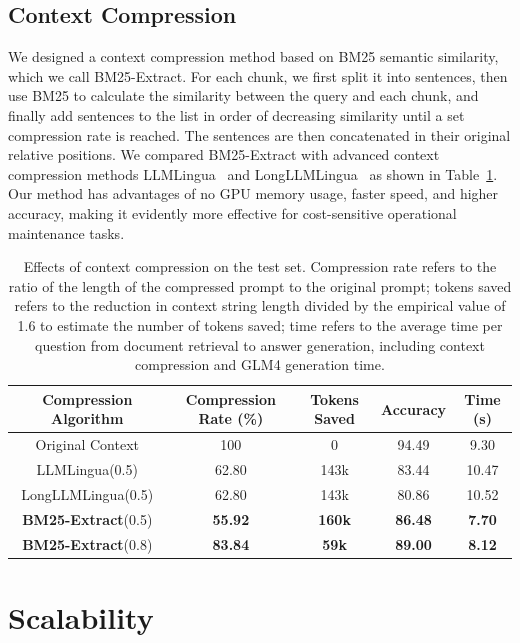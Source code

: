 \documentclass[11pt]{article}
\begin{document}
\subsection{Context Compression}

We designed a context compression method based on BM25 semantic similarity, which we call BM25-Extract. For each chunk, we first split it into sentences, then use BM25 to calculate the similarity between the query and each chunk, and finally add sentences to the list in order of decreasing similarity until a set compression rate is reached. The sentences are then concatenated in their original relative positions. We compared BM25-Extract with advanced context compression methods LLMLingua~\cite{jiang-etal-2023-llmlingua} and LongLLMLingua~\cite{jiang2023longllmlingua} as shown in Table~\ref{tab:compress}. Our method has advantages of no GPU memory usage, faster speed, and higher accuracy, making it evidently more effective for cost-sensitive operational maintenance tasks.

\begin{table}[htp]
\setlength{\tabcolsep}{3pt}
\tiny
\centering
\begin{tabular}{ccccc}
\toprule
 \textbf{Compression Algorithm} & \textbf{Compression Rate (\%)} & \textbf{Tokens Saved} & \textbf{Accuracy} & \textbf{Time (s)} \\
\midrule
Original Context & 100 & 0 & 94.49 & 9.30 \\
LLMLingua(0.5) & 62.80 & 143k & 83.44 & 10.47 \\
LongLLMLingua(0.5) & 62.80 & 143k & 80.86 & 10.52 \\
\textbf{BM25-Extract}(0.5) & \textbf{55.92} & \textbf{160k} & \textbf{86.48} & \textbf{7.70} \\
\textbf{BM25-Extract}(0.8) & \textbf{83.84} & \textbf{59k} & \textbf{89.00} & \textbf{8.12} \\
\bottomrule
\end{tabular}
\caption{Effects of context compression on the test set. Compression rate refers to the ratio of the length of the compressed prompt to the original prompt; tokens saved refers to the reduction in context string length divided by the empirical value of 1.6 to estimate the number of tokens saved; time refers to the average time per question from document retrieval to answer generation, including context compression and GLM4 generation time.}
 \label{tab:compress}
\end{table}

\section{Scalability}
\end{document}
